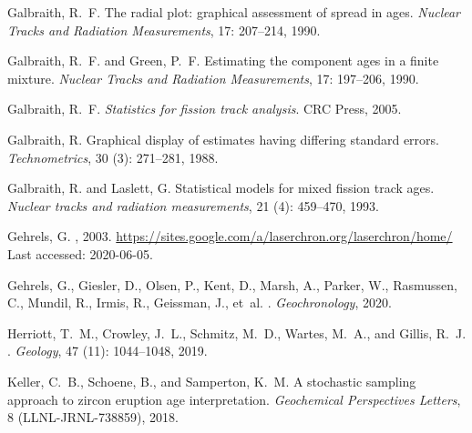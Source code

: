 \documentclass{article}
\begin{document}
\begin{thebibliography}{32}
Galbraith, R.~F.
\newblock The radial plot: graphical assessment of spread in ages.
\newblock \emph{Nuclear Tracks and Radiation Measurements}, 17:
  207--214, 1990.

Galbraith, R.~F. and Green, P.~F.
\newblock Estimating the component ages in a finite mixture.
\newblock \emph{Nuclear Tracks and Radiation Measurements}, 17:
  197--206, 1990.

Galbraith, R.~F.
\newblock \emph{Statistics for fission track analysis}.
\newblock CRC Press, 2005.

Galbraith, R.
\newblock Graphical display of estimates having differing standard errors.
\newblock \emph{Technometrics}, 30 (3): 271--281, 1988.

Galbraith, R. and Laslett, G.
\newblock Statistical models for mixed fission track ages.
\newblock \emph{Nuclear tracks and radiation measurements}, 21
  (4): 459--470, 1993.

Gehrels, G.
, 2003.
\newblock \url{https://sites.google.com/a/laserchron.org/laserchron/home/} Last
  accessed: 2020-06-05.

Gehrels, G., Giesler, D., Olsen, P., Kent, D., Marsh, A., Parker, W.,
  Rasmussen, C., Mundil, R., Irmis, R., Geissman, J., et~al.
.
\newblock \emph{Geochronology}, 2020.

Herriott, T.~M., Crowley, J.~L., Schmitz, M.~D., Wartes, M.~A., and Gillis,
  R.~J.
.
\newblock \emph{Geology}, 47 (11): 1044--1048, 2019.

Keller, C.~B., Schoene, B., and Samperton, K.~M.
\newblock A stochastic sampling approach to zircon eruption age interpretation.
\newblock \emph{Geochemical Perspectives Letters}, 8
  (LLNL-JRNL-738859), 2018.


\end{thebibliography}
\end{document}
